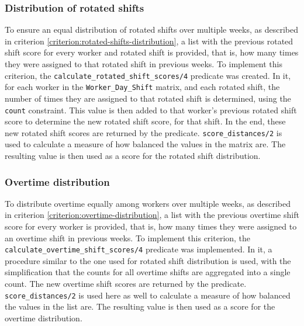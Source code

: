 \documentclass[conference]{IEEEtran}
\def\constraint#1{\vspace{4pt} {#1}}
\begin{document}
\constraint {
    \subsubsection*{Distribution of rotated shifts}
    To ensure an equal distribution of rotated shifts over multiple weeks, as described in criterion \ref{criterion:rotated-shifts-distribution}, a list with the previous rotated shift score for every worker and rotated shift is provided, that is, how many times they were assigned to that rotated shift in previous weeks. 
    To implement this criterion, the \texttt{calculate\_rotated\_shift\_scores/4} predicate was created. In it, for each worker in the \texttt{Worker\_Day\_Shift} matrix, and each rotated shift, the number of times they are assigned to that rotated shift is determined, using the \texttt{count} constraint. This value is then added to that worker's previous rotated shift score to determine the new rotated shift score, for that shift. In the end, these new rotated shift scores are returned by the predicate. \texttt{score\_distances/2} is used to calculate a measure of how balanced the values in the matrix are. The resulting value is then used as a score for the rotated shift distribution.
}


\constraint {
    \subsubsection*{Overtime distribution}
    To distribute overtime equally among workers over multiple weeks, as described in criterion \ref{criterion:overtime-distribution}, a list with the previous overtime shift score for every worker is provided, that is, how many times they were assigned to an overtime shift in previous weeks. 
    To implement this criterion, the \texttt{calculate\_overtime\_shift\_scores/4} predicate was implemented. In it, a procedure similar to the one used for rotated shift distribution is used, with the simplification that the counts for all overtime shifts are aggregated into a single count. The new overtime shift scores are returned by the predicate. \texttt{score\_distances/2} is used here as well to calculate a measure of how balanced the values in the list are. The resulting value is then used as a score for the overtime distribution.
}
\end{document}
